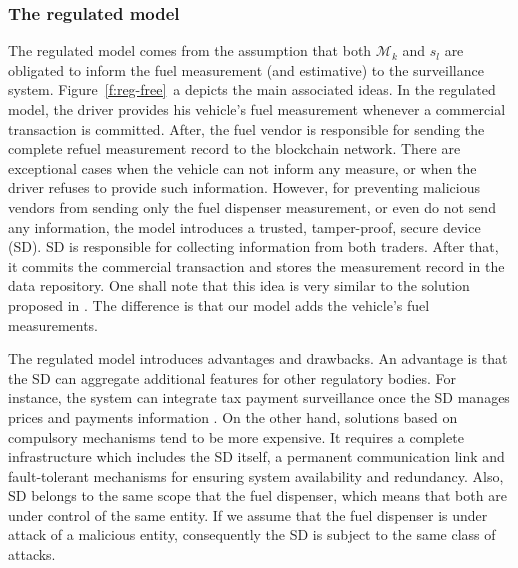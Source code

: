 \documentclass[sigplan]{acmart}
\begin{document}
\subsubsection{The regulated model}


The regulated model comes from the assumption that both $\mathcal{M}_k$ and $s_l$ are obligated to inform the fuel measurement (and estimative) to the surveillance system.
Figure~\ref{f:reg-free}~a depicts the main associated ideas.
In the regulated model, the driver provides his vehicle's fuel measurement whenever a commercial transaction is committed.
After, the fuel vendor is responsible for sending the complete refuel measurement record to the blockchain network.
There are exceptional cases when the vehicle can not inform any measure, or when the driver refuses to provide such information.
However, for preventing malicious vendors from sending only the fuel dispenser measurement, or even do not send any information, the model introduces a trusted, tamper-proof, secure device (SD).
SD is responsible for collecting information from both traders.
After that, it commits the commercial transaction and stores the measurement record in the data repository.
One shall note that this idea is very similar to the solution proposed in \cite{Beteto2016}. The difference is that our model adds the vehicle's fuel measurements.  

The regulated model introduces advantages and drawbacks.
An advantage is that the SD can aggregate additional features for other regulatory bodies. 
For instance, the system can integrate tax payment surveillance once the SD manages prices and payments information \cite{Beteto2016}. 
On the other hand, solutions based on compulsory mechanisms tend to be more expensive.
It requires a complete infrastructure which includes the SD itself, a permanent communication link and fault-tolerant mechanisms for ensuring system availability and redundancy.
Also, SD belongs to the same scope that the fuel dispenser, which means that both are under control of the same entity.
If we assume that the fuel dispenser is under attack of a malicious entity, consequently the SD is subject to the same class of attacks.
\end{document}

